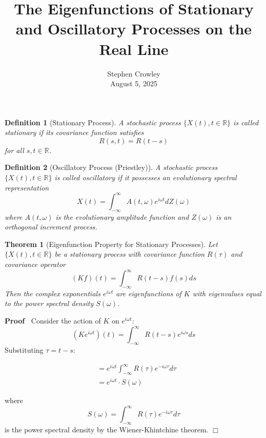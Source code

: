 \documentclass{article}
\newcommand{\tmaffiliation}[1]{\\ #1}
\newenvironment{proof}{\noindent\textbf{Proof\ }}{\hspace*{\fill}$\Box$\medskip}
\newtheorem{definition}{Definition}
\newtheorem{theorem}{Theorem}
\begin{document}
\title{The Eigenfunctions of Stationary and Oscillatory Processes on the Real
Line}

\author{
  Stephen Crowley
  \tmaffiliation{August 5, 2025}
}

\date{}

\maketitle

\begin{definition}[Stationary Process]
  A stochastic process $\{X (t), t \in \mathbb{R}\}$ is called stationary if
  its covariance function satisfies
  \[ R (s, t) = R (t - s) \]
  for all $s, t \in \mathbb{R}$.
\end{definition}

\begin{definition}[Oscillatory Process (Priestley)]
  A stochastic process $\{X (t), t \in \mathbb{R}\}$ is called oscillatory if
  it possesses an evolutionary spectral representation
  \[ X (t) = \int_{- \infty}^{\infty} A (t, \omega) e^{i \omega t} dZ (\omega)
  \]
  where $A (t, \omega)$ is the evolutionary amplitude function and $Z
  (\omega)$ is an orthogonal increment process.
\end{definition}

\begin{theorem}[Eigenfunction Property for Stationary Processes]
  Let $\{X (t), t \in \mathbb{R}\}$ be a stationary process with covariance
  function $R (\tau)$ and covariance operator
  \[ (Kf) (t) = \int_{- \infty}^{\infty} R (t - s) f (s) ds \]
  Then the complex exponentials $e^{i \omega t}$ are eigenfunctions of $K$
  with eigenvalues equal to the power spectral density $S (\omega)$.
\end{theorem}

\begin{proof}
  Consider the action of $K$ on $e^{i \omega t}$:
  \[ (Ke^{i \omega t}) (t) = \int_{- \infty}^{\infty} R (t - s) e^{i \omega s}
     ds \]
  Substituting $\tau = t - s$:
  
  \begin{align*}
    & = e^{i \omega t}  \int_{- \infty}^{\infty} R (\tau) e^{- i \omega \tau}
    d \tau\\
    & = e^{i \omega t} \cdot S (\omega)
  \end{align*}
  
  where
  \[ S (\omega) = \int_{- \infty}^{\infty} R (\tau) e^{- i \omega \tau} d \tau
  \]
  is the power spectral density by the Wiener-Khintchine theorem.
\end{proof}
\end{document}
